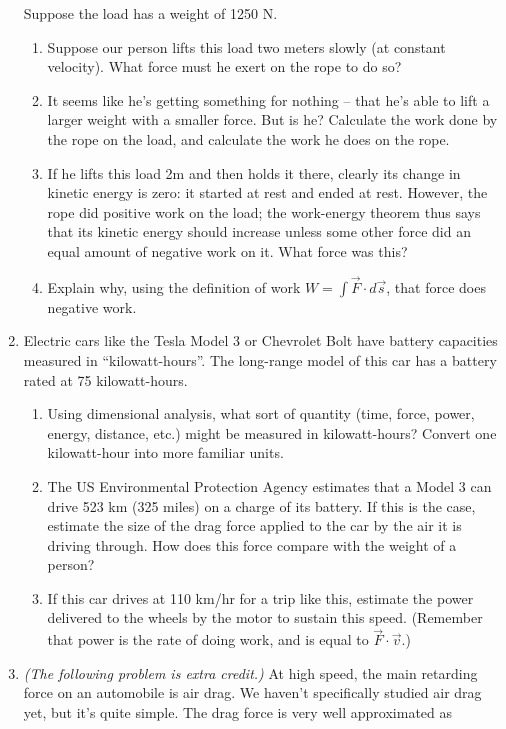 \documentclass[12pt]{article}
\begin{document}
\begin{enumerate}
{       Suppose the load has a weight of 1250 N. 

       \begin{enumerate}
         \item{Suppose our person lifts this load two meters slowly (at constant velocity). What force must he exert on the rope to do so?} 
         \item{It seems like he's getting something for nothing -- that he's able to lift a larger weight with a smaller force. But is he? Calculate the work done by the rope on the load, and calculate the work he does on the rope.}
         \item{If he lifts this load 2m and then holds it there, clearly its change in kinetic energy is zero: it started at rest and ended at rest. However, the rope did positive work on the load; the work-energy theorem thus says that its kinetic energy should
             increase unless some other force did an equal amount of negative work on it. What force was this?}
         \item{Explain why, using the definition of work $W = \int \vec F \cdot d\vec s$, that force does negative work.}
       \end{enumerate}
     }

\item Electric cars like the Tesla Model 3 or Chevrolet Bolt have battery capacities measured in ``kilowatt-hours''. The long-range model of this car has a battery rated at 75 kilowatt-hours. 
\begin{enumerate}
\item Using dimensional analysis, what sort of quantity (time, force, power, energy, distance, etc.) might be measured in kilowatt-hours? Convert one kilowatt-hour into more familiar units.
\item The US Environmental Protection Agency estimates that a Model 3 can drive 523 km (325 miles) on a charge of its battery. If this is the case, estimate the size of the drag force applied to the car by the air it is driving through. How does this force
compare with the weight of a person?
\item If this car drives at 110 km/hr for a trip like this, estimate the power delivered to the wheels by the motor to sustain
this speed. (Remember that power is the rate of doing work, and is equal to $\vec F \cdot \vec v$.)
\end{enumerate}


   \item{{\it (The following problem is extra credit.)} At high speed, the main retarding force on an automobile is air drag. We haven't specifically studied air drag yet, 
but it's quite simple. The drag force is very well approximated as 

}
\end{enumerate}
\end{document}
